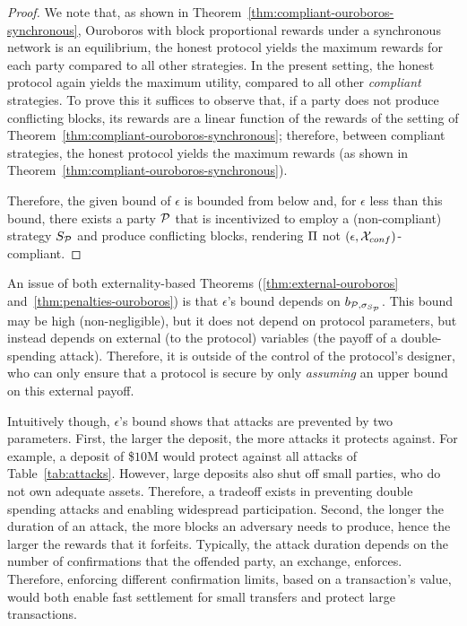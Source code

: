 \begin{proof}
    We note that, as shown in
    Theorem~\ref{thm:compliant-ouroboros-synchronous}, Ouroboros with block
    proportional rewards under a synchronous network is an equilibrium, \ie the
    honest protocol yields the maximum rewards for each party compared to all
    other strategies. In the present setting, the honest protocol again yields
    the maximum utility, compared to all other \emph{compliant} strategies. To
    prove this it suffices to observe that, if a party does not produce
    conflicting blocks, its rewards are a linear function of the rewards of the
    setting of Theorem~\ref{thm:compliant-ouroboros-synchronous}; therefore,
    between compliant strategies, the honest protocol yields the maximum
    rewards (as shown in Theorem~\ref{thm:compliant-ouroboros-synchronous}).

    Therefore, the given bound of $\epsilon$ is bounded from below and, for
    $\epsilon$ less than this bound, there exists a party $\mathcal{P}$ that is
    incentivized to employ a (non-compliant) strategy $S_{\mathcal{P}}$ and
    produce conflicting blocks, rendering $\Pi$ not $(\epsilon,
    \mathcal{X}_{conf})$-compliant.
\end{proof}

An issue of both externality-based Theorems (\ref{thm:external-ouroboros}
and~\ref{thm:penalties-ouroboros}) is that $\epsilon$'s bound depends on
$b_{\mathcal{P}, \sigma_{S_{\mathcal{P}}}}$. This bound may be
high (\ie non-negligible), but it does not depend on protocol parameters, but
instead depends on external (to the protocol) variables (\eg the payoff of a
double-spending attack). Therefore, it is outside of the control of the
protocol's designer, who can only ensure that a protocol is secure by only
\emph{assuming} an upper bound on this external payoff.

Intuitively though, $\epsilon$'s bound shows that
attacks are prevented by two parameters.
First, the larger the deposit, the more attacks it protects against. For
example, a deposit of \$$10$M would protect against all attacks of
Table~\ref{tab:attacks}. However, large deposits also shut off small parties,
who do not own adequate assets. Therefore, a tradeoff exists in preventing
double spending attacks and enabling widespread participation.
Second, the longer the duration of an attack, the more blocks an adversary
needs to produce, hence the larger the rewards that it forfeits. Typically,
the attack duration depends on the number of confirmations that the offended
party, \eg an exchange, enforces. Therefore, enforcing different confirmation
limits, based on a transaction's value, would both enable fast settlement for
small transfers and protect large transactions.

